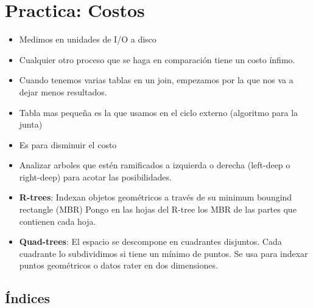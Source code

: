 \section{Practica: Costos}

\begin{itemize}
\item Medimos en unidades de I/O a disco
\item Cualquier otro proceso que se haga en comparación tiene un costo ínfimo.
\item Cuando tenemos varias tablas en un join, empezamos por la que nos va a dejar menos resultados.
\item Tabla mas pequeña es la que usamos en el ciclo externo (algoritmo para la junta)
\item Es para disminuir el costo
\item Analizar arboles que estén ramificados a izquierda o derecha (left-deep o right-deep) para acotar las posibilidades.
\item \textbf{R-trees}: Indexan objetos geométricos a través de su minimum boungind rectangle (MBR) Pongo en las hojas del R-tree los MBR de las partes que contienen cada hoja.
\item \textbf{Quad-trees}: El espacio se descompone en cuadrantes disjuntos. Cada cuadrante lo subdividimos si tiene un mínimo de puntos. Se usa para indexar puntos geométricos o datos rater en dos dimensiones.
\end{itemize}

\subsection*{Índices}

